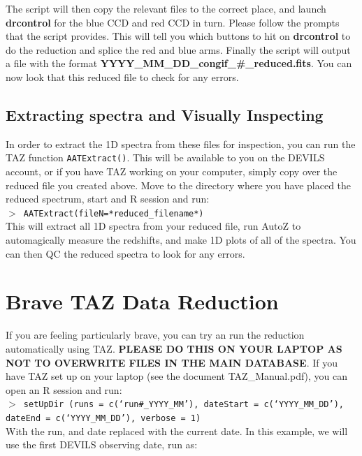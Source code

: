 \documentclass[12pt]{article}
\begin{document}
The script will then copy the relevant files to the correct place, and launch \textbf{drcontrol} for the blue CCD and red CCD in turn. Please follow the prompts that the script provides. This will tell you which buttons to hit on  \textbf{drcontrol} to do the reduction and splice the red and blue arms. Finally the script will output a file with the format \textbf{YYYY\_MM\_DD\_congif\_\#\_reduced.fits}. You can now look that this reduced file to check for any errors. 

\subsection{Extracting spectra and Visually Inspecting}

In order to extract the 1D spectra from these files for inspection, you can run the TAZ function \texttt{AATExtract()}. This will be available to you on the DEVILS account, or if you have TAZ working on your computer, simply copy over the reduced file you created above. Move to the directory where you have placed the reduced spectrum, start and R session and run:\\

 \texttt{$>$ AATExtract(fileN=*reduced\_filename*)}\\
 
This will extract all 1D spectra from your reduced file, run AutoZ to automagically measure the redshifts, and make 1D plots of all of the spectra. You can then QC the reduced spectra to look for any errors. 


\section{Brave TAZ Data Reduction}

If you are feeling particularly brave, you can try an run the reduction automatically using TAZ. \textbf{\textcolor{PineGreen}{PLEASE DO THIS ON YOUR LAPTOP AS NOT TO OVERWRITE FILES IN THE MAIN DATABASE}}. If you have TAZ set up on your laptop (see the document TAZ\_Manual.pdf), you can open an R session and run:\\

\texttt{$>$ setUpDir (runs = c(`run\#\_YYYY\_MM'), dateStart = c(`YYYY\_MM\_DD'), dateEnd = c(`YYYY\_MM\_DD'), verbose = 1)} \\

With the run, and date replaced with the current date. In this example, we will use the first DEVILS observing date, run as:\\
\end{document}

